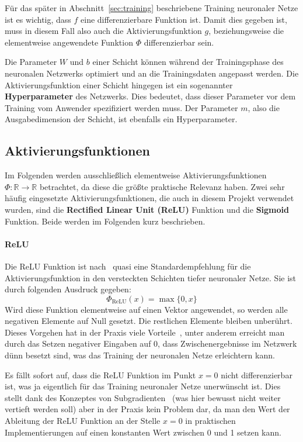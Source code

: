 F\"ur das sp\"ater in Abschnitt~\ref{sec:training} beschriebene
Training neuronaler Netze ist es wichtig, dass $f$ eine differenzierbare
Funktion ist. Damit dies gegeben ist, muss in diesem Fall also auch die
Aktivierungsfunktion $g$, beziehungsweise die elementweise angewendete
Funktion $\Phi$ differenzierbar sein.

Die Parameter $W$ und $b$ einer Schicht k\"onnen w\"ahrend der Trainingsphase
des neuronalen Netzwerks optimiert und an die Trainingsdaten
angepasst werden.
Die Aktivierungsfunktion einer Schicht hingegen ist ein sogenannter
\textbf{Hyperparameter} des Netzwerks. Dies bedeutet, dass dieser
Parameter vor dem Training vom Anwender spezifiziert werden muss.
Der Parameter $m$, also die Ausgabedimension der Schicht, ist ebenfalls
ein Hyperparameter.

\subsection{Aktivierungsfunktionen}

Im Folgenden werden ausschlie{\ss}lich elementweise Aktivierungsfunktionen
$\Phi: \mathbb{R} \rightarrow \mathbb{R}$ betrachtet,
da diese die gr\"o{\ss}te praktische Relevanz haben.
Zwei sehr h\"aufig eingesetzte Aktivierungsfunktionen, die auch in diesem
Projekt verwendet wurden, sind die \textbf{Rectified Linear Unit (ReLU)}
Funktion und die \textbf{Sigmoid} Funktion.
Beide werden im Folgenden kurz beschrieben.

\paragraph{ReLU}

Die ReLU Funktion ist nach~\cite{glorot} quasi eine
Standardempfehlung f\"ur die Aktivierungsfunktion in den
versteckten Schichten tiefer neuronaler Netze.
Sie ist durch folgenden Ausdruck gegeben:
\begin{equation*}
    \Phi_\text{ReLU}(x) = \max \{ 0, x \}
\end{equation*}
Wird diese Funktion elementweise auf einen Vektor angewendet, so werden
alle negativen Elemente auf Null gesetzt. Die restlichen Elemente bleiben
unber\"uhrt.
Dieses Vorgehen hat in der Praxis viele Vorteile~\cite{glorot}, unter
anderem erreicht man durch das Setzen negativer Eingaben auf 0,
dass Zwischenergebnisse im Netzwerk d\"unn besetzt sind, was das Training
der neuronalen Netze erleichtern kann.

Es f\"allt sofort auf, dass die ReLU Funktion im Punkt $x=0$ nicht
differenzierbar ist, was ja eigentlich f\"ur das Training neuronaler
Netze unerw\"unscht ist.
Dies stellt dank des Konzeptes von Subgradienten~\cite{understanding_ml}
(was hier bewusst nicht weiter vertieft werden soll)
aber in der Praxis kein Problem dar, da man den Wert der Ableitung der ReLU Funktion
an der Stelle $x=0$ in praktischen Implementierungen auf einen konstanten
Wert zwischen 0 und 1 setzen kann.

